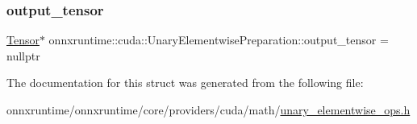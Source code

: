 \mbox{\label{structonnxruntime_1_1cuda_1_1UnaryElementwisePreparation_aa1ff1e66eebf4792062fbb9990d2df2e}} 
\subsubsection{\texorpdfstring{output\+\_\+tensor}{output\_tensor}}
{\footnotesize\ttfamily \mbox{\hyperlink{classonnxruntime_1_1Tensor}{Tensor}}$\ast$ onnxruntime\+::cuda\+::\+Unary\+Elementwise\+Preparation\+::output\+\_\+tensor = nullptr}



The documentation for this struct was generated from the following file\+:\begin{DoxyCompactItemize}
\item 
onnxruntime/onnxruntime/core/providers/cuda/math/\mbox{\hyperlink{unary__elementwise__ops_8h}{unary\+\_\+elementwise\+\_\+ops.\+h}}\end{DoxyCompactItemize}
